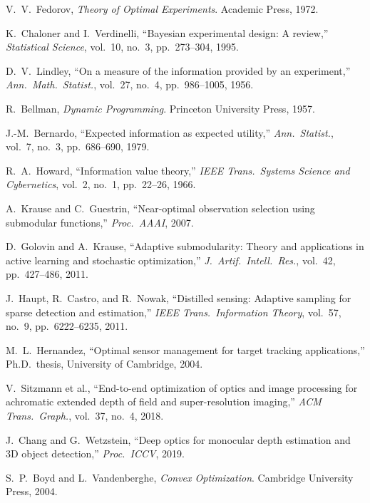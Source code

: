 \documentclass[11pt,a4paper]{article}
\begin{document}
\begin{enumerate}[label={[\arabic*]}]
  \item V.~V.~Fedorov, \emph{Theory of Optimal Experiments}.  Academic Press, 1972.
  \item K.~Chaloner and I.~Verdinelli, ``Bayesian experimental design: A review,'' \emph{Statistical Science}, vol.~10, no.~3, pp.~273--304, 1995.
  \item D.~V.~Lindley, ``On a measure of the information provided by an experiment,'' \emph{Ann.\ Math.\ Statist.}, vol.~27, no.~4, pp.~986--1005, 1956.
  \item R.~Bellman, \emph{Dynamic Programming}.  Princeton University Press, 1957.
  \item J.-M.~Bernardo, ``Expected information as expected utility,'' \emph{Ann.\ Statist.}, vol.~7, no.~3, pp.~686--690, 1979.
  \item R.~A.~Howard, ``Information value theory,'' \emph{IEEE Trans.\ Systems Science and Cybernetics}, vol.~2, no.~1, pp.~22--26, 1966.
  \item A.~Krause and C.~Guestrin, ``Near-optimal observation selection using submodular functions,'' \emph{Proc.\ AAAI}, 2007.
  \item D.~Golovin and A.~Krause, ``Adaptive submodularity: Theory and applications in active learning and stochastic optimization,'' \emph{J.\ Artif.\ Intell.\ Res.}, vol.~42, pp.~427--486, 2011.
  \item J.~Haupt, R.~Castro, and R.~Nowak, ``Distilled sensing: Adaptive sampling for sparse detection and estimation,'' \emph{IEEE Trans.\ Information Theory}, vol.~57, no.~9, pp.~6222--6235, 2011.
  \item M.~L.~Hernandez, ``Optimal sensor management for target tracking applications,'' Ph.D.\ thesis, University of Cambridge, 2004.
  \item V.~Sitzmann et al., ``End-to-end optimization of optics and image processing for achromatic extended depth of field and super-resolution imaging,'' \emph{ACM Trans.\ Graph.}, vol.~37, no.~4, 2018.
  \item J.~Chang and G.~Wetzstein, ``Deep optics for monocular depth estimation and 3D object detection,'' \emph{Proc.\ ICCV}, 2019.
  \item S.~P.~Boyd and L.~Vandenberghe, \emph{Convex Optimization}.  Cambridge University Press, 2004.
\end{enumerate}

\appendix

\end{document}
